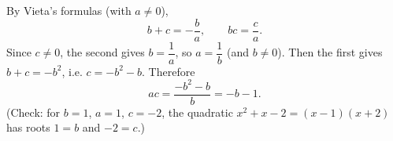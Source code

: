 By Vieta's formulas (with $a\ne0$),
\[
b+c=-\dfrac {b}{a},\qquad bc=\dfrac {c}{a}.
\]
Since $c\ne0$, the second gives $b=\dfrac{1}{a}$, so $a=\dfrac{1}{b}$ (and $b\ne0$). Then the first gives $b+c=-b^2$, i.e. $c=-b^2-b$. Therefore
\[
ac=\dfrac{-b^2-b}{b}=\boxed{-b-1}.
\]
(Check: for $b=1$, $a=1$, $c=-2$, the quadratic $x^2+x-2=(x-1)(x+2)$ has roots $1=b$ and $-2=c$.)

